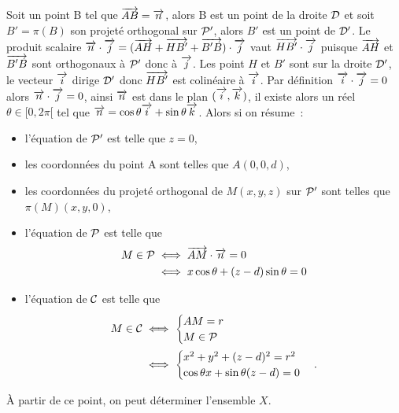 Soit un point B tel que \(\vect{AB}=\vn\), alors B est un point de la droite \(\Dr\) et soit \(B'=\pi(B)\) son projeté orthogonal sur \(\P'\), alors \(B'\) est un point de \(\Dr'\). Le produit scalaire \(\vn\cdot\vj=(\vect{AH}+\vect{HB'}+\vect{B'B})\cdot\vj\) vaut \(\vect{HB'}\cdot\vj\) puisque \(\vect{AH}\) et \(\vect{B'B}\) sont orthogonaux à \(\P'\) donc à \(\vj\). Les point \(H\) et \(B'\) sont sur la droite \(\Dr'\), le vecteur \(\vi\) dirige \(\Dr'\) donc \(\vect{HB'}\) est colinéaire à \(\vi\). Par définition \(\vi\cdot \vj=0\) alors \(\vn\cdot \vj=0\), ainsi \(\vn\) est dans le plan \((\vi,\vk)\), il existe alors un réel \(\theta\in[0,2\pi[\) tel que \(\vn=\cos\theta\vi+\sin\theta\vk\). Alors si on résume~:
\begin{itemize}
\item l'équation de \(\P'\) est telle que \(z=0\),
\item les coordonnées du point A sont telles que \(A(0,0,d)\),
\item les coordonnées du projeté orthogonal de \(M(x,y,z)\) sur \(\P'\) sont telles que \(\pi(M)(x,y,0)\),
\item l'équation de \(\P\) est telle que 
  \begin{align}
    M\in\P &\iff \vect{AM}\cdot\vn=0\\ &\iff x\cos\theta+(z-d)\sin\theta=0
  \end{align}
\item l'équation de \(\courbe\) est telle que 
  \begin{align}
    M\in\courbe &\iff \begin{cases} AM=r\\M\in\P \end{cases}\\
    &\iff \begin{cases} x^2+y^2+(z-d)^2=r^2\\ \cos\theta x+\sin\theta (z-d)=0\end{cases}.
  \end{align}
\end{itemize}
À partir de ce point, on peut déterminer l'ensemble \(X\).

